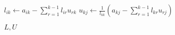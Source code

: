 \documentclass[varwidth]{standalone}
\begin{document}
\begin{algorithmic}[1]

        \State $l_{ik} \gets a_{ik} - \displaystyle\sum_{r=1}^{k-1}l_{ir}u_{rk}$
    \EndFor
        \State $u_{kj} \gets \displaystyle\frac{1}{l_{kk}}\left( a_{kj} - \sum_{r=1}^{k-1}l_{kr}u_{rj} \right)$
    \EndFor
\EndFor

\State \Return $L, U$

\EndFunction
\end{algorithmic}
\end{document}
